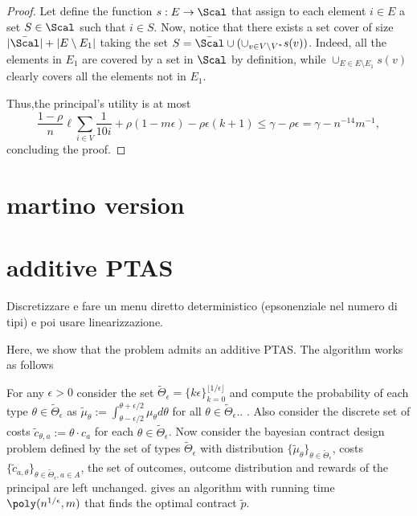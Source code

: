 \begin{proof}
	Let define the function $s:E\rightarrow\Scal$ that assign to each element $i \in E$ a set $S \in \Scal$ such that $i\in S$.
	Now, notice that there exists a set cover of size $|\bar\Scal|+ |E\setminus E_1|$ taking the set $S=\bar\Scal\cup (\cup_{v \in V\setminus V^*} s(v))$. Indeed, all the elements in $E_1$ are covered by a set in $\Scal$ by definition, while $\cup_{E \in E \setminus E_1} s(v)$ clearly covers all the elements not in $E_1$.
	
	Thus,the principal's utility is at most
	\[ \frac{1-\rho}{n} \ell \sum_{i \in V} \frac{1}{10i}    + \rho (1-m\epsilon) - \rho \epsilon (k+1)\le \gamma - \rho \epsilon= \gamma- n^{-14} m^{-1}, \]
	concluding the proof.
	
	
	
	
	
\end{proof}

\section{martino version}

\section{additive PTAS}


Discretizzare e fare un menu diretto deterministico (epsonenziale nel numero di tipi) e poi usare linearizzazione.


Here, we show that the problem admits an additive PTAS. The algorithm works as follows

For any $\epsilon>0$ consider the set $\tilde\Theta_\epsilon=\{k\epsilon\}_{k=0}^{\lfloor 1/\epsilon\rfloor}$ and compute the probability of each type $\theta \in \tilde\Theta_\epsilon$ as $\tilde \mu_{\theta}:=\int_{\theta-\epsilon/2}^{\theta+\epsilon/2}\mu_\theta d\theta$ for all $\theta\in \tilde\Theta_\epsilon$.. . Also consider the discrete set of costs $\tilde c_{\theta, a}:=\theta\cdot c_a$ for each $\theta\in\tilde \Theta_\epsilon$. Now consider the bayesian contract design problem defined by the set of types $\tilde \Theta_{\epsilon}$ with distribution $\{\tilde \mu_{\theta}\}_{\theta\in\tilde\Theta_\epsilon}$, costs $\{\tilde c_{a,\theta}\}_{\theta\in\tilde\Theta_\epsilon,a\in A}$, the set of outcomes, outcome distribution and rewards of the principal are left unchanged. \citet[Theorem~8]{castiglioni2022bayesian} gives an algorithm with running time $\poly(n^{1/\epsilon}, m)$ that finds the optimal contract $\tilde p$.

